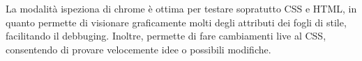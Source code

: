 La modalità ispeziona di chrome è ottima per testare sopratutto CSS e HTML, in quanto permette di visionare graficamente molti degli attributi dei fogli di stile, facilitando il debbuging. Inoltre, permette di fare cambiamenti live al CSS, consentendo di provare velocemente idee o possibili modifiche.